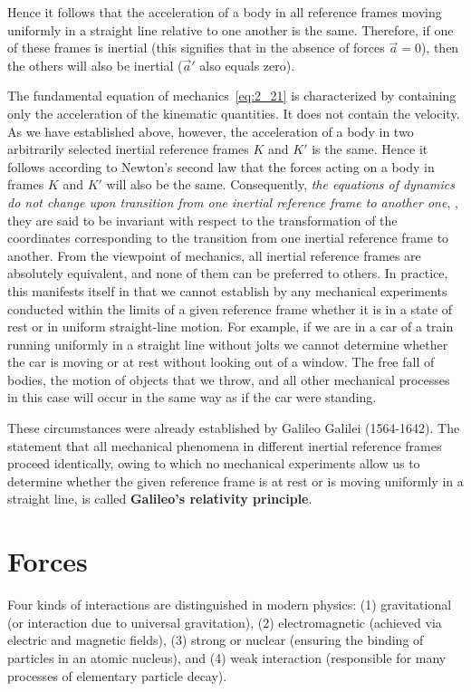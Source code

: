 \noindent
Hence it follows that the acceleration of a body in all reference frames moving uniformly in a straight line relative to one another is the same. Therefore, if one of these frames is inertial (this signifies that in the absence of forces $\vec{a}=0$), then the others will also be inertial ($\vec{a}'$ also equals zero).

The fundamental equation of mechanics~\eqref{eq:2_21} is characterized by containing only the acceleration of the kinematic quantities. It does not contain the velocity. As we have established above, however, the acceleration of a body in two arbitrarily selected inertial reference frames $K$ and $K'$ is the same. Hence it follows according to Newton's second law that the forces acting on a body in frames $K$ and $K'$ will also be the same. Consequently, \textit{the equations of dynamics do not change upon transition from one inertial reference frame to another one}, \ie, they are said to be invariant with respect to the transformation of the coordinates corresponding to the transition from one inertial reference frame to another. From the viewpoint of mechanics, all inertial reference frames are absolutely equivalent, and none of them can be preferred to others. In practice, this manifests itself in that we cannot establish by any mechanical experiments conducted within the limits of a given reference frame whether it is in a state of rest or in uniform straight-line motion. For example, if we are in a car of a train running uniformly in a straight line without jolts we cannot determine whether the car is moving or at rest without looking out of a window. The free fall of bodies, the motion of objects that we throw, and all other mechanical processes in this case will occur in the same way as if the car were standing.

These circumstances were already established by Galileo Galilei (1564-1642). The statement that all mechanical phenomena in different inertial reference frames proceed identically, owing to which no mechanical experiments allow us to determine whether the given reference frame is at rest or is moving uniformly in a straight line, is called \textbf{Galileo's relativity principle}.

\section{Forces}\label{sec:2_8}

Four kinds of interactions are distinguished in modern physics: (1) gravitational (or interaction due to universal gravitation), (2) electromagnetic (achieved via electric and magnetic fields), (3) strong or nuclear (ensuring the binding of particles in an atomic nucleus), and (4) weak interaction (responsible for many processes of elementary particle decay).

